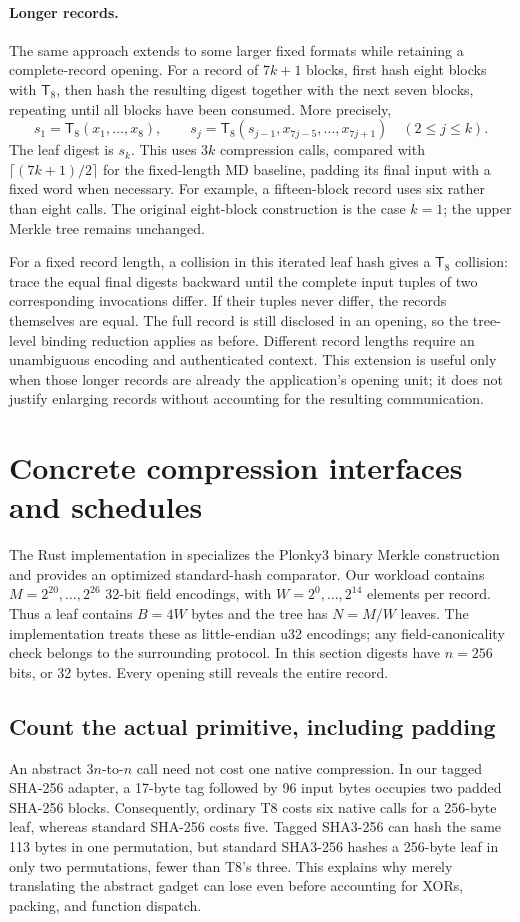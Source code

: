 \documentclass[11pt,letterpaper]{article}
\theoremstyle{definition} %
\newcommand{\Tate}{\mathsf{T}_{8}}
\begin{document}
\paragraph{Longer records.}
The same approach extends to some larger fixed formats while retaining a
complete-record opening. For a record of $7k+1$ blocks, first hash eight
blocks with $\Tate$, then hash the resulting digest together with the next
seven blocks, repeating until all blocks have been consumed. More precisely,
\[
 s_1=\Tate(x_1,\ldots,x_8),\qquad
 s_j=\Tate(s_{j-1},x_{7j-5},\ldots,x_{7j+1})
 \quad(2\leq j\leq k).
\]
The leaf digest is $s_k$. This uses $3k$ compression calls, compared with
$\lceil(7k+1)/2\rceil$ for the fixed-length MD baseline, padding its final
input with a fixed word when necessary. For example, a fifteen-block record
uses six rather than eight calls. The original eight-block construction is
the case $k=1$; the upper Merkle tree remains unchanged.

For a fixed record length, a collision in this iterated leaf hash gives a
$\Tate$ collision: trace the equal final digests backward until the complete
input tuples of two corresponding invocations differ. If their tuples
never differ, the records themselves are equal. The full record is still
disclosed in an opening, so the tree-level binding reduction applies as
before. Different record lengths require an unambiguous encoding and
authenticated context. This extension is useful only when those longer
records are already the application's opening unit; it does not justify
enlarging records without accounting for the resulting communication.

\section{Concrete compression interfaces and schedules}
\label{sec:concrete}
The Rust implementation in  specializes the Plonky3 binary
Merkle construction and provides an optimized standard-hash comparator.
Our workload contains $M=2^{20},\ldots,2^{26}$ 32-bit field encodings,
with $W=2^0,\ldots,2^{14}$ elements per record. Thus a leaf contains
$B=4W$ bytes and the tree has $N=M/W$ leaves. The implementation treats
these as little-endian u32 encodings; any field-canonicality check belongs
to the surrounding protocol. In this section digests have $n=256$ bits,
or 32 bytes. Every opening still reveals the entire record.

\subsection{Count the actual primitive, including padding}
An abstract $3n$-to-$n$ call need not cost one native compression. In our
tagged SHA-256 adapter, a 17-byte tag followed by 96 input bytes occupies
two padded SHA-256 blocks. Consequently, ordinary T8 costs six native
calls for a 256-byte leaf, whereas standard SHA-256 costs five. Tagged
SHA3-256 can hash the same 113 bytes in one permutation, but standard
SHA3-256 hashes a 256-byte leaf in only two permutations, fewer than
T8's three. This explains why merely translating the abstract gadget can
lose even before accounting for XORs, packing, and function dispatch.
\end{document}
